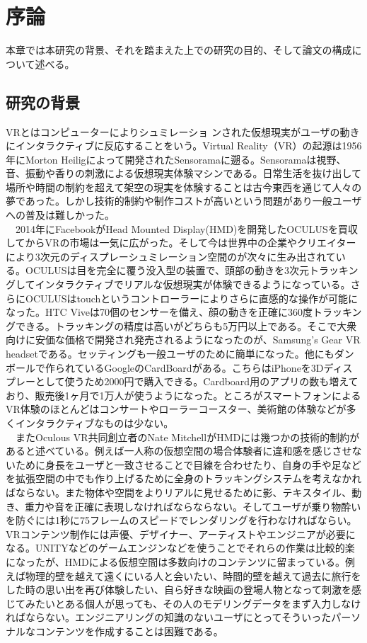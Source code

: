 \chapter{序論}
\label{chap:introduction}

本章では本研究の背景、それを踏まえた上での研究の目的、そして論文の構成について述べる。

\section{研究の背景}
VRとはコンピューターによりシュミレーショ ンされた仮想現実がユーザの動きにインタラクティブに反応することをいう。Virtual Reality（VR）の起源は1956年にMorton Heiligによって開発されたSensoramaに遡る。Sensoramaは視野、音、振動や香りの刺激による仮想現実体験マシンである\cite{sensorama}。日常生活を抜け出して場所や時間の制約を超えて架空の現実を体験することは古今東西を通じて人々の夢であった\cite{verge}。しかし技術的制約や制作コストが高いという問題があり一般ユーザへの普及は難しかった。\\
　2014年にFacebookがHead Mounted Display(HMD)を開発したOCULUSを買収してからVRの市場は一気に広がった\cite{vrtrendShiny}。そして今は世界中の企業やクリエイターにより3次元のディスプレーシュミレーション空間のが次々に生み出されている\cite{vrtrendSamuel}。OCULUSは目を完全に覆う没入型の装置で、頭部の動きを3次元トラッキングしてインタラクティブでリアルな仮想現実が体験できるようになっている。さらにOCULUSはtouchというコントローラーによりさらに直感的な操作が可能になった\cite{touch}。HTC Viveは70個のセンサーを備え、顔の動きを正確に360度トラッキングできる\cite{vive}。トラッキングの精度は高いがどちらも5万円以上である。そこで大衆向けに安価な価格で開発され発売されるようになったのが、Samsung's Gear VR headsetである\cite{samsung}。セッティングも一般ユーザのために簡単になった。他にもダンボールで作られているGoogleのCardBoardがある。こちらはiPhoneを3Dディスプレーとして使うため2000円で購入できる。Cardboard用のアプリの数も増えており、販売後1ヶ月で1万人が使うようになった\cite{cardboard}。ところがスマートフォンによるVR体験のほとんどはコンサートやローラーコースター、美術館の体験などが多くインタラクティブなものは少ない。\\
　またOculous VR共同創立者のNate MitchellがHMDには幾つかの技術的制約があると述べている\cite{oculus}。例えば一人称の仮想空間の場合体験者に違和感を感じさせないために身長をユーザと一致させることで目線を合わせたり、自身の手や足などを拡張空間の中でも作り上げるために全身のトラッキングシステムを考えなかればならない。また物体や空間をよりリアルに見せるために影、テキスタイル、動き、重力や音を正確に表現しなければならならない\cite{vrtrendShiny}。そしてユーザが乗り物酔いを防ぐには1秒に75フレームのスピードでレンダリングを行わなければならい\cite{HMDifficulties}。VRコンテンツ制作には声優、デザイナー、アーティストやエンジニアが必要になる。UNITYなどのゲームエンジンなどを使うことでそれらの作業は比較的楽になったが、HMDによる仮想空間は多数向けのコンテンツに留まっている。例えば物理的壁を越えて遠くにいる人と会いたい、時間的壁を越えて過去に旅行をした時の思い出を再び体験したい、自ら好きな映画の登場人物となって刺激を感じてみたいとある個人が思っても、その人のモデリングデータをまず入力しなければならない。エンジニアリングの知識のないユーザにとってそういったパーソナルなコンテンツを作成することは困難である。\\
